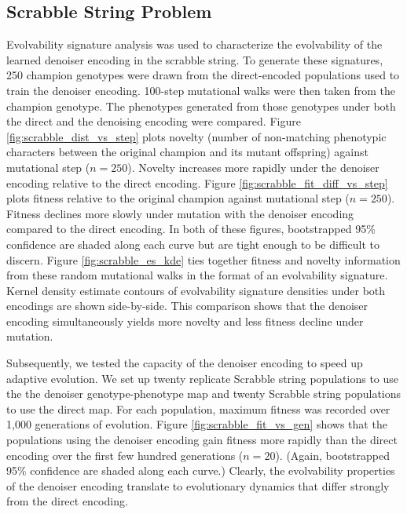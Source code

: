 \subsection{Scrabble String Problem}






Evolvability signature analysis was used to characterize the evolvability of the learned denoiser encoding in the scrabble string.
To generate these signatures, 250 champion genotypes were drawn from the direct-encoded populations used to train the denoiser encoding.
100-step mutational walks were then taken from the champion genotype.
The phenotypes generated from those genotypes under both the direct and the denoising encoding were compared.
Figure \ref{fig:scrabble_dist_vs_step} plots novelty (number of non-matching phenotypic characters between the original champion and its mutant offspring) against mutational step ($n=250$).
Novelty increases more rapidly under the denoiser encoding relative to the direct encoding.
Figure \ref{fig:scrabble_fit_diff_vs_step} plots fitness relative to the original champion against mutational step ($n=250$).
Fitness declines more slowly under mutation with the denoiser encoding compared to the direct encoding.
In both of these figures, bootstrapped 95\% confidence are shaded along each curve but are tight enough to be difficult to discern.
Figure \ref{fig:scrabble_es_kde} ties together fitness and novelty information from these random mutational walks in the format of an evolvability signature.
Kernel density estimate contours of evolvability signature densities under both encodings are shown side-by-side.
This comparison shows that the denoiser encoding simultaneously yields more novelty and less fitness decline under mutation.

Subsequently, we tested the capacity of the denoiser encoding to speed up adaptive evolution.
We set up twenty replicate Scrabble string populations to use the the denoiser genotype-phenotype map and twenty Scrabble string populations to use the direct map.
For each population, maximum fitness was recorded over 1,000 generations of evolution.
Figure \ref{fig:scrabble_fit_vs_gen} shows that the populations using the denoiser encoding gain fitness more rapidly than the direct encoding over the first few hundred generations ($n=20$).
(Again, bootstrapped 95\% confidence are shaded along each curve.)
Clearly, the evolvability properties of the denoiser encoding translate to evolutionary dynamics that differ strongly from the direct encoding.

